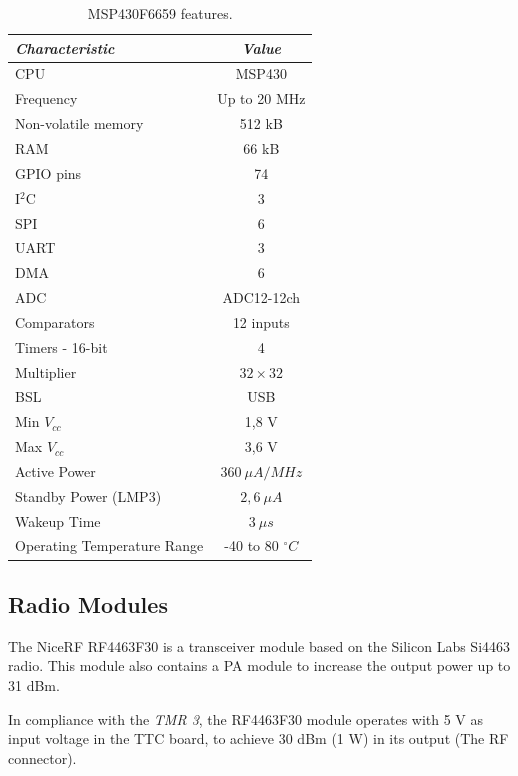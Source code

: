 \begin{table}[!h]
	\begin{center}
		\begin{tabular}{lc}
			\toprule[1.5pt]
			\textit{Characteristic} & \textit{Value} \\
			\midrule
			CPU & MSP430 \\
			Frequency & Up to 20 MHz \\
			Non-volatile memory & 512 kB \\
			RAM & 66 kB \\
			GPIO pins & 74 \\
			I$^{2}$C & 3 \\
			SPI & 6 \\
			UART & 3 \\
			DMA & 6 \\
			ADC & ADC12-12ch \\
			Comparators & 12 inputs \\
			Timers - 16-bit & 4 \\
			Multiplier & $32 \times 32$ \\
			BSL & USB \\
			Min $V_{cc}$ & 1,8 V \\
			Max $V_{cc}$ & 3,6 V \\
			Active Power & $360\ \mu A/MHz$ \\
			Standby Power (LMP3) & $2,6\ \mu A$ \\
			Wakeup Time & $3\ \mu s$ \\
			Operating Temperature Range & -40 to 80 $^{\circ}C$ \\
			\bottomrule[1.5pt]
		\end{tabular}
		\caption{MSP430F6659 features.}
		\label{tab:msp430f6659-info}
	\end{center}
\end{table}

\subsection{Radio Modules}

The NiceRF RF4463F30 \cite{rf4463f30} is a transceiver module based on the Silicon Labs Si4463 \cite{si4463} radio. This module also contains a PA module to increase the output power up to 31 dBm.

In compliance with the \textit{TMR 3}, the RF4463F30 module operates with 5 V as input voltage in the TTC board, to achieve 30 dBm (1 W) in its output (The RF connector).

